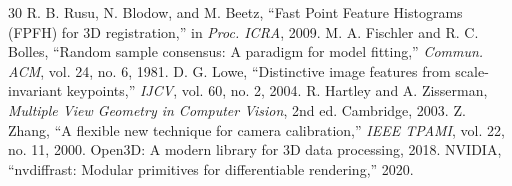 \documentclass[journal]{IEEEtran}
\begin{document}
\begin{thebibliography}{30}
 R. B. Rusu, N. Blodow, and M. Beetz, ``Fast Point Feature Histograms (FPFH) for 3D registration,'' in \emph{Proc. ICRA}, 2009.
 M. A. Fischler and R. C. Bolles, ``Random sample consensus: A paradigm for model fitting,'' \emph{Commun. ACM}, vol. 24, no. 6, 1981.
 D. G. Lowe, ``Distinctive image features from scale-invariant keypoints,'' \emph{IJCV}, vol. 60, no. 2, 2004.
 R. Hartley and A. Zisserman, \emph{Multiple View Geometry in Computer Vision}, 2nd ed. Cambridge, 2003.
 Z. Zhang, ``A flexible new technique for camera calibration,'' \emph{IEEE TPAMI}, vol. 22, no. 11, 2000.
 Open3D: A modern library for 3D data processing, 2018.
 NVIDIA, ``nvdiffrast: Modular primitives for differentiable rendering,'' 2020.
\end{thebibliography}
\end{document}
